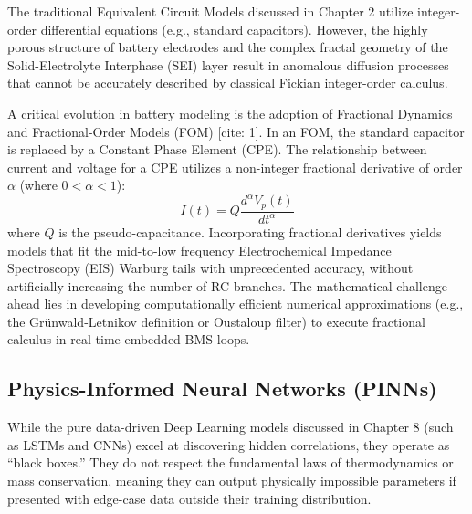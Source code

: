 The traditional Equivalent Circuit Models discussed in Chapter 2 utilize integer-order differential equations (e.g., standard capacitors). However, the highly porous structure of battery electrodes and the complex fractal geometry of the Solid-Electrolyte Interphase (SEI) layer result in anomalous diffusion processes that cannot be accurately described by classical Fickian integer-order calculus. 

A critical evolution in battery modeling is the adoption of Fractional Dynamics and Fractional-Order Models (FOM) \cite{lucu2018critical}[cite: 1]. In an FOM, the standard capacitor is replaced by a Constant Phase Element (CPE). The relationship between current and voltage for a CPE utilizes a non-integer fractional derivative of order $\alpha$ (where $0 < \alpha < 1$):
\begin{equation}
\label{eq:fractional_derivative}
I(t) = Q \frac{d^\alpha V_p(t)}{dt^\alpha}
\end{equation}
where $Q$ is the pseudo-capacitance. Incorporating fractional derivatives yields models that fit the mid-to-low frequency Electrochemical Impedance Spectroscopy (EIS) Warburg tails with unprecedented accuracy, without artificially increasing the number of RC branches. The mathematical challenge ahead lies in developing computationally efficient numerical approximations (e.g., the Grünwald-Letnikov definition or Oustaloup filter) to execute fractional calculus in real-time embedded BMS loops.

\subsection{Physics-Informed Neural Networks (PINNs)}
\label{subsec:pinns}

While the pure data-driven Deep Learning models discussed in Chapter 8 (such as LSTMs and CNNs) excel at discovering hidden correlations, they operate as ``black boxes.'' They do not respect the fundamental laws of thermodynamics or mass conservation, meaning they can output physically impossible parameters if presented with edge-case data outside their training distribution.

